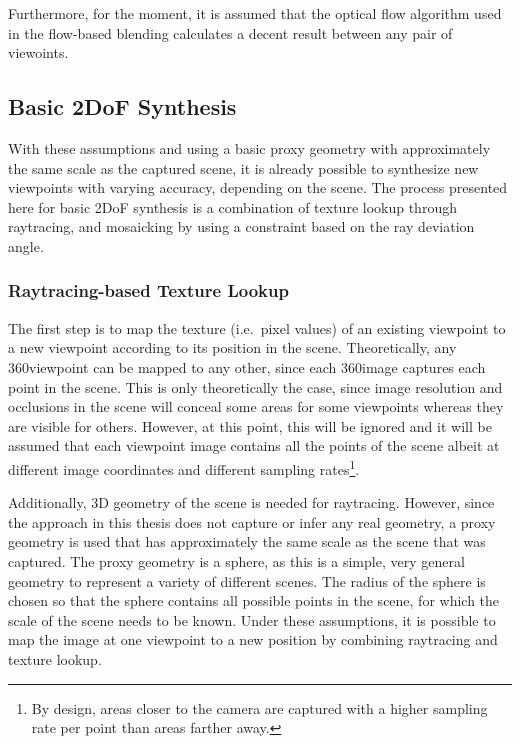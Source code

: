 Furthermore, for the moment, it is assumed that the optical flow algorithm used in the flow-based blending calculates a decent result between any pair of viewoints.

\subsection{Basic 2DoF Synthesis} \label{subsec:basic-synthesis}
With these assumptions and using a basic proxy geometry with approximately the same scale as the captured scene, it is already possible to synthesize new viewpoints with varying accuracy, depending on the scene. The process presented here for basic 2DoF synthesis is a combination of texture lookup through raytracing, and mosaicking by using a constraint based on the ray deviation angle.

\subsubsection{Raytracing-based Texture Lookup}
The first step is to map the texture (i.e.\ pixel values) of an existing viewpoint to a new viewpoint according to its position in the scene. Theoretically, any 360\degree viewpoint can be mapped to any other, since each 360\degree image captures each point in the scene. This is only theoretically the case, since image resolution and occlusions in the scene will conceal some areas for some viewpoints whereas they are visible for others. However, at this point, this will be ignored and it will be assumed that each viewpoint image contains all the points of the scene albeit at different image coordinates and different sampling rates\footnote{By design, areas closer to the camera are captured with a higher sampling rate per point than areas farther away.}. 

Additionally, 3D geometry of the scene is needed for raytracing. However, since the approach in this thesis does not capture or infer any real geometry, a proxy geometry is used that has approximately the same scale as the scene that was captured. The proxy geometry is a sphere, as this is a simple, very general geometry to represent a variety of different scenes. The radius of the sphere is chosen so that the sphere contains all possible points in the scene, for which the scale of the scene needs to be known. Under these assumptions, it is possible to map the image at one viewpoint to a new position by combining raytracing and texture lookup.

